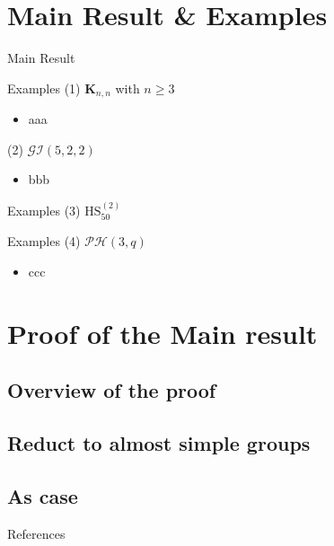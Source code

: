 \documentclass{beamer}
\begin{document}
\section{Main Result \& Examples}
\begin{frame}{Main Result}

\end{frame}

\begin{frame}{Examples}
(1) $\mathbf{K}_{n,n}$ with $n\geq 3$
\begin{itemize}
	\item aaa
\end{itemize}

(2) $\mathcal{GI}(5,2,2)$
\begin{itemize}
	\item bbb
\end{itemize}

\end{frame}

\begin{frame}{Examples}
(3) $\mathrm{HS}_{50}^{(2)}$

\end{frame}

\begin{frame}{Examples}
(4) $\mathcal{PH}(3,q)$
\begin{itemize}
	\item ccc
\end{itemize}
\end{frame}


\section{Proof of the Main result}
\subsection{Overview of the proof}
\subsection{Reduct to almost simple groups}
\subsection{As case}





\begin{frame}{References}
\small


\end{frame}
\end{document}
